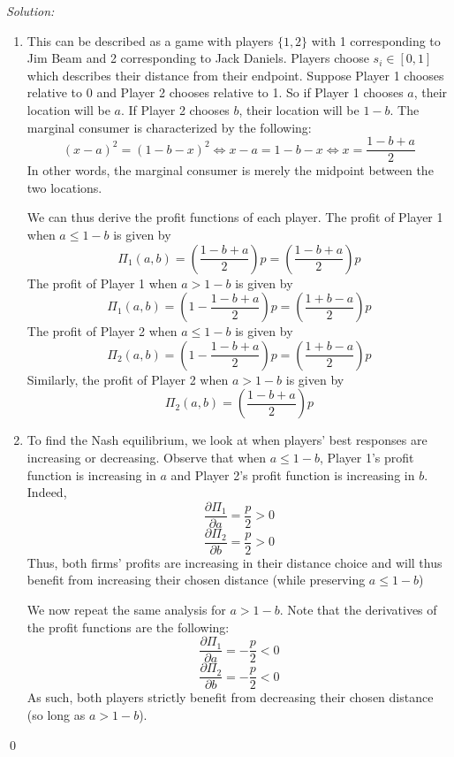 \documentclass[12pt]{article}
\newenvironment{sol}
    {\emph{Solution:}
    }
    {
    \qed
    }
\begin{document}
\begin{sol}
    \begin{enumerate}[label=\alph*) ]
        \item This can be described as a game with players $\{1,2\}$ with 1 corresponding to Jim Beam and 2 corresponding to Jack Daniels. Players choose $s_i \in [0,1]$ which describes their distance from their endpoint. Suppose Player 1 chooses relative to 0 and Player 2 chooses relative to 1. So if Player 1 chooses $a$, their location will be $a$. If Player 2 chooses $b$, their location will be $1-b$. The marginal consumer is characterized by the following:
         \[(x - a)^2 = (1-b - x)^2 \iff x - a = 1-b - x \iff x = \frac{1 - b + a}{2}\]
         In other words, the marginal consumer is merely the midpoint between the two locations.

         We can thus derive the profit functions of each player. The profit of Player 1 when $a \leq 1- b$ is given by
         \[\Pi_1(a,b) = \left( \frac{1 - b + a}{2}\right) p = \left(\frac{1 - b + a}{2}\right)p\]
         The profit of Player 1 when $a > 1-b$ is given by
         \[\Pi_1(a,b) = \left(1 - \frac{1 - b + a}{2}\right) p = \left(\frac{1 + b - a}{2}\right) p\]
         The profit of Player 2 when $a \leq 1-b$ is given by
         \[\Pi_2(a,b) = \left(1 - \frac{1 - b + a}{2}\right) p = \left(\frac{1 + b - a}{2}\right) p\]
         Similarly, the profit of Player 2 when $a > 1-b$ is given by
         \[\Pi_2(a,b) = \left(\frac{1 - b + a}{2}\right)p\]
         \item To find the Nash equilibrium, we look at when players' best responses are increasing or decreasing. Observe that when $a \leq 1-b$, Player 1's profit function is increasing in $a$ and Player 2's profit function is increasing in $b$. Indeed,
         \[\frac{\partial \Pi_1}{\partial a} = \frac{p}{2} > 0\]
         \[\frac{\partial \Pi_2 }{\partial b} = \frac{p}{2} > 0\]
         Thus, both firms' profits are increasing in their distance choice and will thus benefit from increasing their chosen distance (while preserving $a \leq 1-b$)

         We now repeat the same analysis for $a > 1-b$. Note that the derivatives of the profit functions are the following:
         \[\frac{\partial \Pi_1}{\partial a} = -\frac{p}{2} < 0\]
         \[\frac{\partial \Pi_2 }{\partial b} = -\frac{p}{2} < 0\]
         As such, both players strictly benefit from decreasing their chosen distance (so long as $a > 1-b$).


\end{enumerate}
\end{sol}
\end{document}

